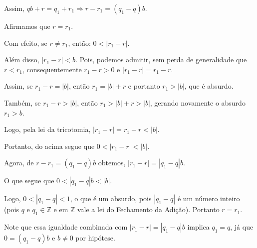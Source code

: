 \begin{description}
    Assim, $qb +  r = q_1 + r_1 \Rightarrow r-r_1 = (q_1 - q)b$.

    Afirmamos que $r = r_1$.

    Com efeito, se $r \neq r_1$, então: $0 < |r_1 - r|$.

    Além disso, $|r_1 - r| < b$. Pois, podemos admitir, sem perda de generalidade que $r < r_1$, consequentemente $r_1 - r > 0$ e $|r_1 - r| = r_1 - r$.

    Assim, se $r_1 - r = |b|$, então $r_1 = |b| + r$ e portanto $r_1 > |b|$, que é absurdo.

    Também, se $r_1 - r > |b|$, então $r_1 > |b| + r > |b|$, gerando novamente o absurdo $r_1 > b$.

    Logo, pela lei da tricotomia, $|r_1 - r| = r_1 - r < |b|$.

    Portanto, do acima segue que $0 < |r_1 - r| < |b|$.

    Agora, de $r-r_1 = (q_1 - q)b$ obtemos, $|r_1 - r| = |q_1 - q|b$.

    O que segue que $0 <  |q_1 - q|b < |b|$.

    Logo, $0 < |q_1 - q| < 1$, o que é um absurdo, pois $|q_1 - q|$ é um número inteiro (pois $q$ e $q_1 \in \mathbb{Z}$ e em $\mathbb{Z}$ vale a lei do Fechamento da Adição). Portanto $r = r_1$.

    Note que essa igualdade combinada com $|r_1 - r| = |q_1 - q|b$ implica $q_1 = q$, já que $0 = (q_1 - q)b$ e $b \neq 0$ por hipótese.
\end{description}